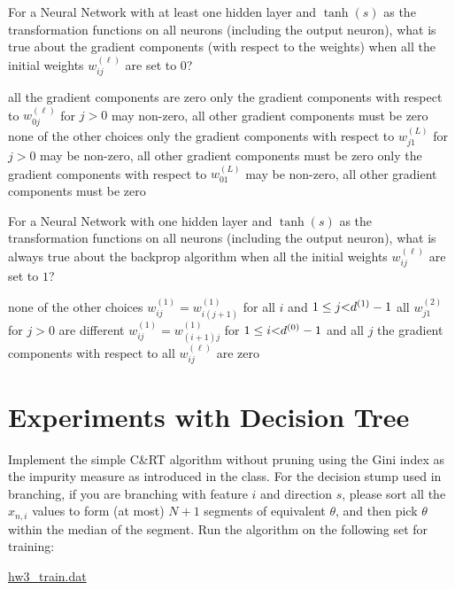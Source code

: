 \documentclass[a4paper,10pt]{exam}
\begin{document}
\begin{questions}
	\question For a Neural Network with at least one hidden layer and $\tanh(s)$ as the transformation functions on all neurons (including the output neuron), what is true about the gradient components (with respect to the weights) when all the initial weights $w_{ij}^{(\ell)}$ are set to $0$?
	\begin{checkboxes}
		\choice all the gradient components are zero
		\choice only the gradient components with respect to $w_{0j}^{(\ell)}$ for $j > 0$ may non-zero, all other gradient components must be zero
		\choice none of the other choices
		\choice only the gradient components with respect to $w_{j1}^{(L)}$ for $j>0$ may be non-zero, all other gradient components must be zero
		\CorrectChoice only the gradient components with respect to $w_{01}^{(L)}$ may be non-zero, all other gradient components must be zero \\
	\end{checkboxes}

	\question For a Neural Network with one hidden layer and $\tanh(s)$ as the transformation functions on all neurons (including the output neuron), what is always true about the backprop algorithm when all the initial weights $w_{ij}^{(\ell)}$ are set to $1$?
	\begin{checkboxes}
		\choice none of the other choices
		\CorrectChoice $w_{ij}^{(1)} = w_{i(j+1)}^{(1)}$ for all $i$ and $1 \le j{\rm{  < }}{d^{(1)}} - 1$
		\choice all $w_{j1}^{(2)}$ for $j>0$ are different
		\choice $w_{ij}^{(1)} = w_{(i+1)j}^{(1)}$ for $1 \le i{\rm{  < }}{d^{(0)}} - 1$ and all $j$
		\choice the gradient components with respect to all $w_{ij}^{(\ell)}$ are zero\\
	\end{checkboxes}

	\section*{Experiments with Decision Tree}
	\question
	Implement the simple C\&RT algorithm without pruning using the Gini index as the impurity measure as introduced in the class. For the decision stump used in branching, if you are branching with feature $i$ and direction $s$, please sort all the $x_{n, i}$ values to form (at most) $N+1$ segments of equivalent $\theta$, and then pick $\theta$ within the median of the segment. Run the algorithm on the following set for training:

	\href{https://d396qusza40orc.cloudfront.net/ntumltwo/hw3_data/hw3_train.dat}{hw3\_train.dat}


\end{questions}
\end{document}
